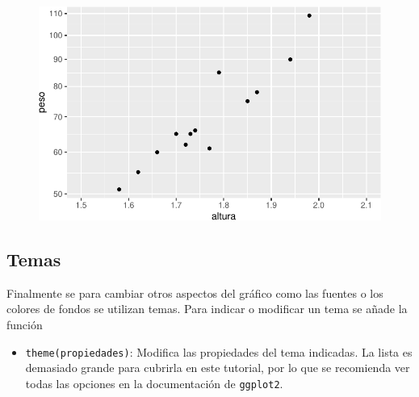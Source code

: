 \documentclass[
  a4paper,
]{scrreport}
\providecommand{\tightlist}{%
  \setlength{\itemsep}{0pt}\setlength{\parskip}{0pt}}\usepackage{longtable,booktabs,array}
\theoremstyle{definition}
\theoremstyle{definition}
\theoremstyle{remark}
\begin{document}
\begin{figure}[H]

{\centering \includegraphics{07-graficos_files/figure-pdf/unnamed-chunk-29-1.pdf}

}

\end{figure}

\hypertarget{temas}{%
\subsection{Temas}\label{temas}}

Finalmente se para cambiar otros aspectos del gráfico como las fuentes o
los colores de fondos se utilizan temas. Para indicar o modificar un
tema se añade la función

\begin{itemize}
\tightlist
\item
  \texttt{theme(propiedades)}: Modifica las propiedades del tema
  indicadas. La lista es demasiado grande para cubrirla en este
  tutorial, por lo que se recomienda ver todas las opciones en la
  documentación de \texttt{ggplot2}.
\end{itemize}
\end{document}
